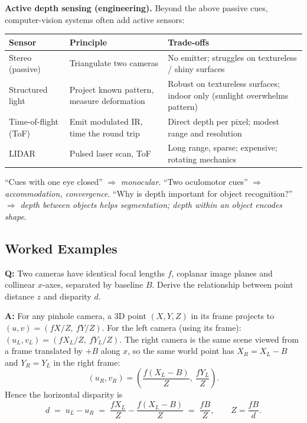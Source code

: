 \separator

\textbf{Active depth sensing (engineering).} Beyond the above passive cues, computer-vision systems often add active sensors:
\begin{center}
\renewcommand{\arraystretch}{1.3}
\begin{tabular}{@{} l p{4.5cm} p{5.5cm} @{}}
\toprule
\textbf{Sensor} & \textbf{Principle} & \textbf{Trade-offs} \\
\midrule
Stereo (passive) & Triangulate two cameras & No emitter; struggles on textureless / shiny surfaces \\
Structured light & Project known pattern, measure deformation & Robust on textureless surfaces; indoor only (sunlight overwhelms pattern) \\
Time-of-flight (ToF) & Emit modulated IR, time the round trip & Direct depth per pixel; modest range and resolution \\
LIDAR & Pulsed laser scan, ToF & Long range, sparse; expensive; rotating mechanics \\
\bottomrule
\end{tabular}
\end{center}

\begin{tipbox}
``Cues with one eye closed'' $\Rightarrow$ \emph{monocular}. ``Two oculomotor cues'' $\Rightarrow$ \emph{accommodation, convergence}. ``Why is depth important for object recognition?'' $\Rightarrow$ \emph{depth between objects helps segmentation; depth within an object encodes shape}.
\end{tipbox}

\bigseparator

\subsection{Worked Examples}

\begin{exbox}[Example 1: Derive $z = fB/d$ for coplanar cameras]
\textbf{Q:} Two cameras have identical focal lengths $f$, coplanar image planes and collinear $x$-axes, separated by baseline $B$. Derive the relationship between point distance $z$ and disparity $d$.

\textbf{A:} For any pinhole camera, a 3D point $(X,Y,Z)$ in its frame projects to $(u,v) = (fX/Z,\ fY/Z)$.
For the left camera (using its frame): $(u_L, v_L) = (fX_L/Z,\ fY_L/Z)$.
The right camera is the same scene viewed from a frame translated by $+B$ along $x$, so the same world point has $X_R = X_L - B$ and $Y_R = Y_L$ in the right frame:
\[
(u_R, v_R) = \left(\frac{f(X_L-B)}{Z},\ \frac{fY_L}{Z}\right).
\]
Hence the horizontal disparity is
\[
d \;=\; u_L - u_R \;=\; \frac{fX_L}{Z} - \frac{f(X_L-B)}{Z} \;=\; \frac{fB}{Z}, \qquad \boxed{Z = \frac{fB}{d}}.
\]
\end{exbox}

